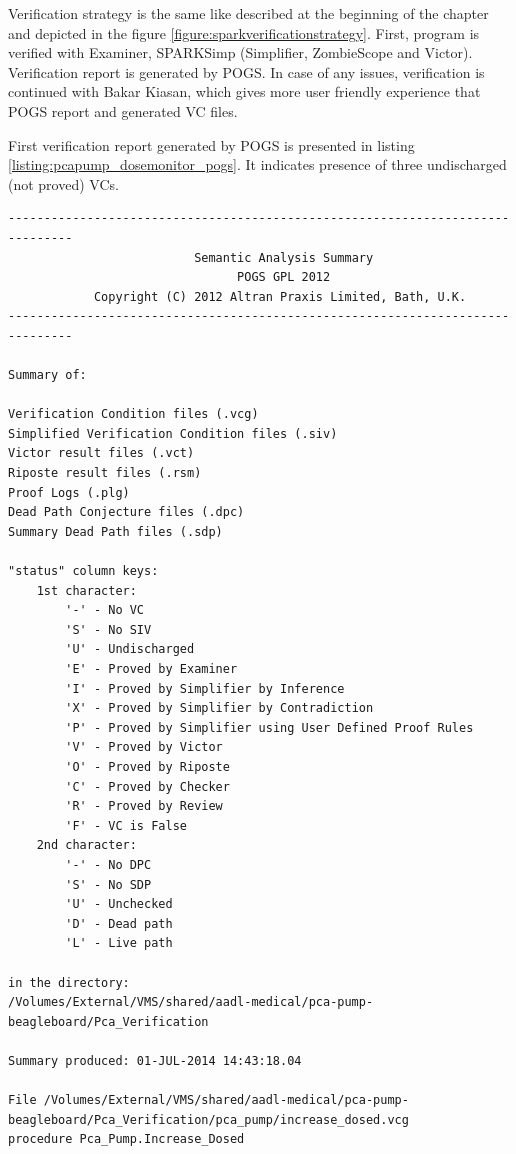 Verification strategy is the same like described at the beginning of the chapter and depicted in the figure \ref{figure:sparkverificationstrategy}. First, program is verified with Examiner, SPARKSimp (Simplifier, ZombieScope and Victor). Verification report is generated by POGS. In case of any issues, verification is continued with Bakar Kiasan, which gives more user friendly experience that POGS report and generated VC files. 

First verification report generated by POGS is presented in listing \ref{listing:pcapump_dosemonitor_pogs}. It indicates presence of three undischarged (not proved) VCs.

\singlespacing
\begin{lstlisting}[frame=single, gobble=0, caption={POGS report}, label={listing:pcapump_dosemonitor_pogs}]
-------------------------------------------------------------------------------
                          Semantic Analysis Summary                            
                                POGS GPL 2012                                  
            Copyright (C) 2012 Altran Praxis Limited, Bath, U.K.               
-------------------------------------------------------------------------------

Summary of:

Verification Condition files (.vcg)
Simplified Verification Condition files (.siv)
Victor result files (.vct)
Riposte result files (.rsm)
Proof Logs (.plg)
Dead Path Conjecture files (.dpc)
Summary Dead Path files (.sdp)

"status" column keys:
    1st character:
        '-' - No VC
        'S' - No SIV
        'U' - Undischarged
        'E' - Proved by Examiner
        'I' - Proved by Simplifier by Inference
        'X' - Proved by Simplifier by Contradiction
        'P' - Proved by Simplifier using User Defined Proof Rules
        'V' - Proved by Victor
        'O' - Proved by Riposte
        'C' - Proved by Checker
        'R' - Proved by Review
        'F' - VC is False
    2nd character:
        '-' - No DPC
        'S' - No SDP
        'U' - Unchecked
        'D' - Dead path
        'L' - Live path

in the directory:
/Volumes/External/VMS/shared/aadl-medical/pca-pump-beagleboard/Pca_Verification

Summary produced: 01-JUL-2014 14:43:18.04

File /Volumes/External/VMS/shared/aadl-medical/pca-pump-beagleboard/Pca_Verification/pca_pump/increase_dosed.vcg
procedure Pca_Pump.Increase_Dosed


\end{lstlisting}
